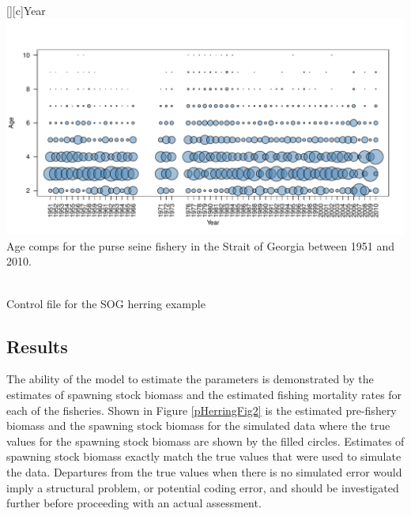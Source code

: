 \begin{multicols}{2}
\begin{figurehere}
	\centering
	[][c]{Year}
	\includegraphics[height=\columnwidth,angle=-90]{iscamfigs/pHerringFig3.pdf}\\
	\caption{Age comps for the purse seine fishery in the Strait of Georgia between 1951 and 2010.}\label{pHerringFig3}
\end{figurehere}
\vspace{0.1in}

\noindent \hrulefill\\
\small
Control file for the SOG herring example
\tiny
\begin{alltt}

\end{alltt}
\hrulefill
\normalsize


\subsection{Results}
The ability of the model to estimate the parameters is demonstrated by the estimates of spawning stock biomass and the estimated fishing mortality rates for each of the fisheries.  Shown in Figure \ref{pHerringFig2} is the estimated pre-fishery biomass and the spawning stock biomass for the simulated data where the true values for the spawning stock biomass are shown by the filled circles.  Estimates of spawning stock biomass exactly match the true values that were used to simulate the data.  Departures from the true values when there is no simulated error would imply a structural problem, or potential coding error, and should be investigated further before proceeding with an actual assessment.



\end{multicols}
